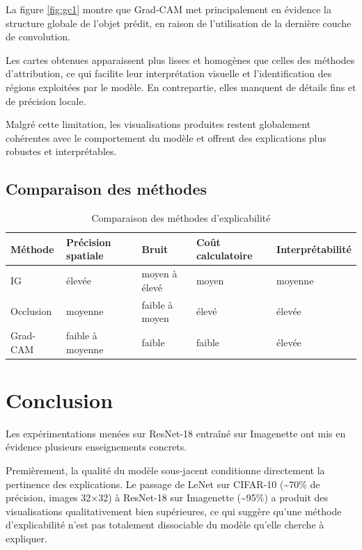 \documentclass{ir}
\begin{document}
La figure \ref{fig:gc1} montre que Grad-CAM met principalement en évidence la structure globale de l'objet prédit, en raison de l'utilisation de la dernière couche de convolution.

Les cartes obtenues apparaissent plus lisses et homogènes que celles des méthodes d'attribution, ce qui facilite leur interprétation visuelle et l'identification des régions exploitées par le modèle.
En contrepartie, elles manquent de détails fins et de précision locale.

Malgré cette limitation, les visualisations produites restent globalement cohérentes avec le comportement du modèle et offrent des explications plus robustes et interprétables.

\subsection*{Comparaison des méthodes}

\begin{table}[h]
\centering
\begin{tabular}{|l|l|l|l|l|}
\hline
\textbf{Méthode} & \textbf{Précision spatiale} & \textbf{Bruit} & \textbf{Coût calculatoire} & \textbf{Interprétabilité} \\
\hline
IG & élevée & moyen à élevé & moyen & moyenne \\
\hline
Occlusion & moyenne & faible à moyen & élevé & élevée \\
\hline
Grad-CAM  & faible à moyenne & faible & faible & élevée \\
\hline
\end{tabular}
\caption{Comparaison des méthodes d'explicabilité}
\label{tab:comparaison_methodes}
\end{table}


\section{Conclusion}

Les expérimentations menées sur ResNet-18 entraîné sur Imagenette ont mis en évidence plusieurs enseignements concrets.

Premièrement, la qualité du modèle sous-jacent conditionne directement la pertinence des explications. Le passage de LeNet sur CIFAR-10 (\textasciitilde 70\% de précision, images 32×32) à ResNet-18 sur Imagenette (\textasciitilde 95\%) a produit des visualisations qualitativement bien supérieures, ce qui suggère qu'une méthode d'explicabilité n'est pas totalement dissociable du modèle qu'elle cherche à expliquer.
\end{document}
